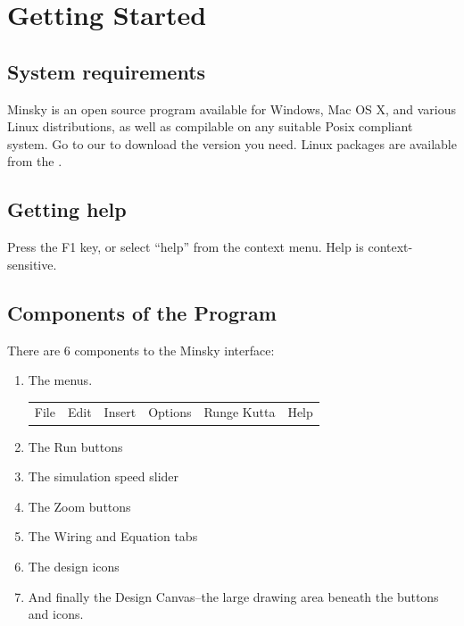 \chapter{Getting Started}

\section{System requirements}

Minsky is an open source program available for Windows, Mac OS X,
and various Linux distributions, as well as compilable on any suitable
Posix compliant system. Go to our  to download the version you need. Linux
packages are available from the .

\section{Getting help}

Press the F1 key, or select ``help'' from the context menu. Help is
context-sensitive.


\section{Components of the Program}

There are 6 components to the Minsky interface:

\begin{enumerate}
\item  The menus.

  \begin{tabular}{llllll}
    File & Edit & Insert & Options & Runge Kutta & Help \\
  \end{tabular}

\item  The Run buttons


\item The simulation speed slider


\item The Zoom buttons


\item The Wiring and Equation tabs


\item The design icons


\item And finally the Design Canvas--the large drawing area beneath the buttons and icons.

\end{enumerate}

